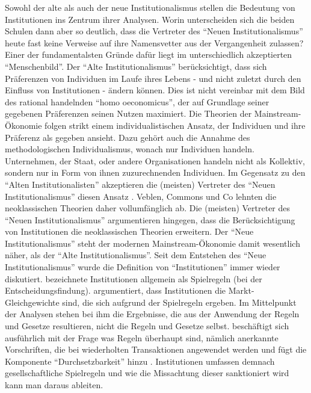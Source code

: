 Sowohl der alte als auch der neue Institutionalismus stellen die Bedeutung von Institutionen ins Zentrum ihrer Analysen. Worin unterscheiden sich die beiden Schulen dann aber so deutlich, dass die Vertreter des "`Neuen Institutionalismus"' heute fast keine Verweise auf ihre Namensvetter aus der Vergangenheit zulassen? Einer der fundamentalsten Gründe dafür liegt im unterschiedlich akzeptierten "`Menschenbild"'. Der "`Alte Institutionalismus"' berücksichtigt, dass sich Präferenzen von Individuen im Laufe ihres Lebens - und nicht zuletzt durch den Einfluss von Institutionen - ändern können. Dies ist nicht vereinbar mit dem Bild des rational handelnden "`homo oeconomicus"', der auf Grundlage seiner gegebenen Präferenzen seinen Nutzen maximiert. Die Theorien der Mainstream-Ökonomie folgen strikt einem individualistischen Ansatz, der Individuen und ihre Präferenz als gegeben ansieht. Dazu gehört auch die Annahme des methodologischen Individualismus, wonach nur Individuen handeln. Unternehmen, der Staat, oder andere Organisationen handeln nicht als Kollektiv, sondern nur in Form von ihnen zuzurechnenden Individuen. Im Gegensatz zu den "`Alten Institutionalisten"' akzeptieren die (meisten) Vertreter des "`Neuen Institutionalismus"' diesen Ansatz \parencite[S. 177]{Hodgson1998}. Veblen, Commons und Co lehnten die neoklassischen Theorien daher vollumfänglich ab. Die (meisten) Vertreter des "`Neuen Institutionalismus"' argumentieren hingegen, dass die Berücksichtigung von Institutionen die neoklassischen Theorien erweitern. Der "`Neue Institutionalismus"' steht der modernen Mainstream-Ökonomie damit wesentlich näher, als der "`Alte Institutionalismus"'.
Seit dem Entstehen des "`Neue Institutionalismus"' wurde die Definition von "`Institutionen"' immer wieder diskutiert. \textcite[S. 4]{Riker1980} bezeichnete Institutionen allgemein als Spielregeln (bei der Entscheidungsfindung). \textcite{Schotter1981} argumentiert, dass Institutionen die Markt-Gleichgewichte sind, die sich aufgrund der Spielregeln ergeben. Im Mittelpunkt der Analysen stehen bei ihm die Ergebnisse, die aus der Anwendung der Regeln und Gesetze resultieren, nicht die Regeln und Gesetze selbst. \textcite{Ostrom1986} beschäftigt sich ausführlich mit der Frage was Regeln überhaupt sind, nämlich anerkannte Vorschriften, die bei wiederholten Transaktionen angewendet werden \parencite[S. 5]{Ostrom1986} und fügt die Komponente "`Durchsetzbarkeit"' hinzu \parencite[S. 6]{Ostrom1986}. Institutionen umfassen demnach gesellschaftliche Spielregeln und wie die Missachtung dieser sanktioniert wird \parencite[S. 26]{Voigt2009} kann man daraus ableiten.


